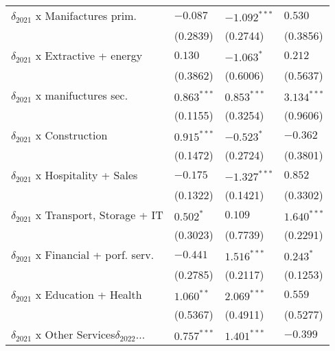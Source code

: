 \begin{tabular}{llll}
$\delta_{2021}$ x Manifactures prim.               &           $-0.087$ &     $-1.092^{***}$ &            $0.530$ \\
                                                   &           (0.2839) &           (0.2744) &           (0.3856) \\
$\delta_{2021}$ x Extractive + energy              &            $0.130$ &         $-1.063^*$ &            $0.212$ \\
                                                   &           (0.3862) &           (0.6006) &           (0.5637) \\
$\delta_{2021}$ x manifuctures sec.                &      $0.863^{***}$ &      $0.853^{***}$ &      $3.134^{***}$ \\
                                                   &           (0.1155) &           (0.3254) &           (0.9606) \\
$\delta_{2021}$ x Construction                     &      $0.915^{***}$ &         $-0.523^*$ &           $-0.362$ \\
                                                   &           (0.1472) &           (0.2724) &           (0.3801) \\
$\delta_{2021}$ x Hospitality + Sales              &           $-0.175$ &     $-1.327^{***}$ &            $0.852$ \\
                                                   &           (0.1322) &           (0.1421) &           (0.3302) \\
$\delta_{2021}$ x Transport, Storage + IT          &          $0.502^*$ &            $0.109$ &      $1.640^{***}$ \\
                                                   &           (0.3023) &           (0.7739) &           (0.2291) \\
$\delta_{2021}$ x Financial + porf. serv.          &           $-0.441$ &      $1.516^{***}$ &          $0.243^*$ \\
                                                   &           (0.2785) &           (0.2117) &           (0.1253) \\
$\delta_{2021}$ x Education + Health               &       $1.060^{**}$ &      $2.069^{***}$ &            $0.559$ \\
                                                   &           (0.5367) &           (0.4911) &           (0.5277) \\
$\delta_{2021}$ x Other Services$\delta_{2022}$... &      $0.757^{***}$ &      $1.401^{***}$ &           $-0.399$ \\

\end{tabular}
